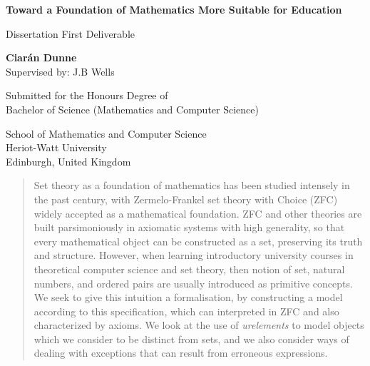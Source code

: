 \documentclass[12pt]{article}
\title{}
\author{Ciarán Dunne}
\theoremstyle{definition}
\begin{document}
\begin{titlepage}
   \begin{center}
       \vspace*{1cm}

       \Large
       \textbf{Toward a Foundation of Mathematics More Suitable for Education}

       \vspace{0.5cm}
       \large
        Dissertation First Deliverable

       \vspace{1.5cm}

       \textbf{Ciarán Dunne}\\
       Supervised by: J.B Wells
       \vfill

       Submitted for the Honours Degree of \\
       Bachelor of Science (Mathematics and Computer Science)

       \vspace{0.8cm}

       School of Mathematics and Computer Science\\
       Heriot-Watt University\\
       Edinburgh, United Kingdom\\
   \end{center}
\end{titlepage}

\begin{minipage}[c]{0.9\textwidth}
\begin{abstract}
\noindent
Set theory as a foundation of mathematics has been studied intensely in the past century, with Zermelo-Frankel set theory with Choice (ZFC) widely accepted as a mathematical foundation.
ZFC and other theories are built parsimoniously in axiomatic systems with high generality, so that every mathematical object can be constructed as a set, preserving its truth and structure.
However, when learning introductory university courses in theoretical computer science and set theory, then notion of set, natural numbers, and ordered pairs are usually introduced as primitive concepts.
We seek to give this intuition a formalisation, by constructing a model according to this specification, which can interpreted in ZFC and also characterized by axioms.
We look at the use of \emph{urelements} to model objects which we consider to be distinct from sets, and we also consider ways of dealing with exceptions that can result from erroneous expressions.
\end{abstract}
\end{minipage}
\clearpage
\end{document}
